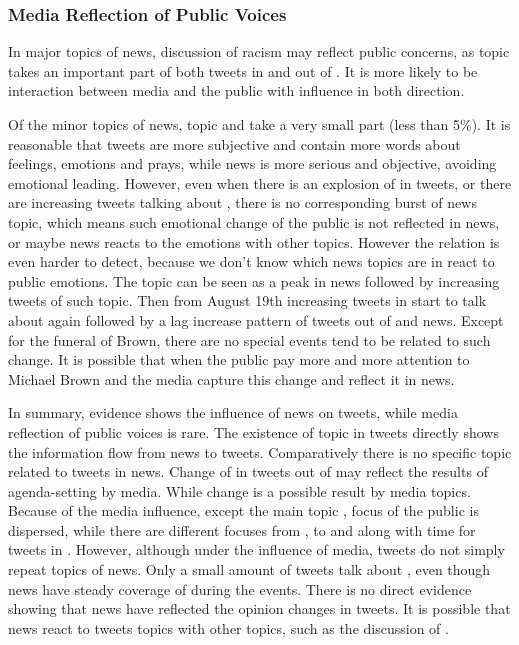 \subsubsection{Media Reflection of Public Voices}
In major topics of news, discussion of racism may reflect public concerns, as topic \racism takes an important part of both tweets in and out of \stlouis. It is more likely to be interaction between media and the public with influence in both direction.

Of the minor topics of news, topic \pray and \emotion take a very small part (less than 5\%). It is reasonable that tweets are more subjective and contain more words about feelings, emotions and prays, while news is more serious and objective, avoiding emotional leading. However, even when there is an explosion of \emotion in tweets, or there are increasing tweets talking about \pray, there is no corresponding burst of news topic, which means such emotional change of the public is not reflected in news, or maybe news reacts to the emotions with other topics. However the relation is even harder to detect, because we don't know which news topics are in react to public emotions.
The topic \michaelbrown can be seen as a peak in news followed by increasing tweets of such topic. Then from August 19th increasing tweets in \stlouis start to talk about \michaelbrown again followed by a lag increase pattern of tweets out of \stlouis and news. Except for the funeral of Brown, there are no special events tend to be related to such change. It is possible that when the public pay more and more attention to Michael Brown and the media capture this change and reflect it in news.

In summary, evidence shows the influence of news on tweets, while media reflection of public voices is rare. The existence of \newsreport topic in tweets directly shows the information flow from news to tweets. Comparatively there is no specific topic related to tweets in news. Change of \racism in tweets out of \stlouis may reflect the results of agenda-setting by media. While \emotion change is a possible result by media topics. Because of the media influence, except the main topic \racism, focus of the public is dispersed, while there are different focuses from \emotion, \racism to \protest and \pray along with time for tweets in \stlouis. However, although under the influence of media, tweets do not simply repeat topics of news. Only a small amount of tweets talk about \obamatalk, even though news have steady coverage of \obamatalk during the events. There is no direct evidence showing that news have reflected the opinion changes in tweets. It is possible that news react to tweets topics with other topics, such as the discussion of \raceandcommunity.

